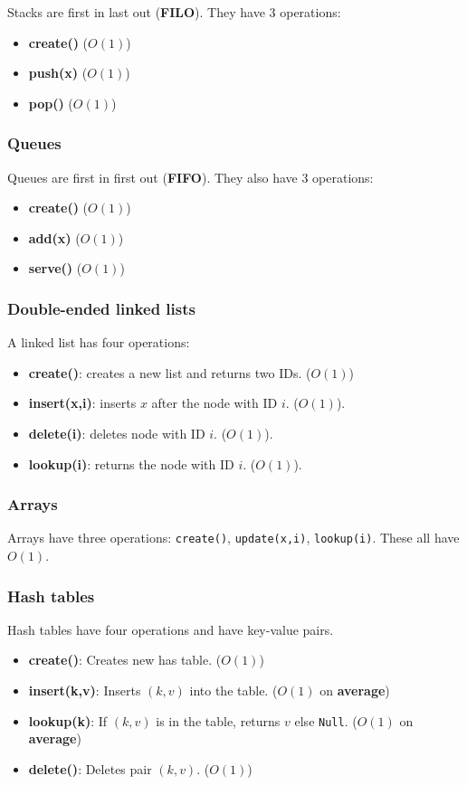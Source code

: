 \documentclass[11pt,fleqn,a4paper,titlepage,dvipsnames,cmyk]{scrartcl}
\begin{document}
Stacks are first in last out (\textbf{FILO}). They have 3 operations:
\begin{itemize}
    \item \textbf{create()} ($O(1)$)
    \item \textbf{push(x)} ($O(1)$)
    \item \textbf{pop()} ($O(1)$)
\end{itemize}

\subsubsection{Queues}%
\label{ssub:Queues}
Queues are first in first out (\textbf{FIFO}). They also have 3
operations:
\begin{itemize}
    \item \textbf{create()} ($O(1)$)
    \item \textbf{add(x)} ($O(1)$)
    \item \textbf{serve()} ($O(1)$)
\end{itemize}

\subsubsection{Double-ended linked lists}%
\label{ssub:Double-ended linked lists}
A linked list has four operations:
\begin{itemize}
    \item \textbf{create()}: creates a new list and returns two IDs. ($O(1)$)
    \item \textbf{insert(x,i)}: inserts $x$ after the node with ID $i$.
        ($O(1)$).
    \item \textbf{delete(i)}: deletes node with ID $i$. ($O(1)$).
    \item \textbf{lookup(i)}: returns the node with ID $i$. ($O(1)$).
\end{itemize}

\subsubsection{Arrays}%
\label{ssub:Arrays}
Arrays have three operations: \texttt{create()}, \texttt{update(x,i)},
\texttt{lookup(i)}. These all have $O(1)$.

\subsubsection{Hash tables}%
\label{ssub:Hash tables}
Hash tables have four operations and have key-value pairs.
\begin{itemize}
    \item \textbf{create()}: Creates new has table. ($O(1)$)
    \item \textbf{insert(k,v)}: Inserts $(k,v)$ into the table. ($O(1)$ on
        \textbf{average})
    \item \textbf{lookup(k)}: If $(k,v)$ is in the table, returns $v$ else
        \texttt{Null}. ($O(1)$ on \textbf{average})
    \item \textbf{delete()}: Deletes pair $(k,v)$. ($O(1)$)
\end{itemize}
\end{document}
